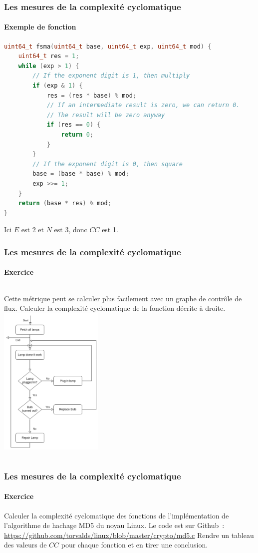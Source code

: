 \documentclass{beamer}
\begin{document}
    \begin{frame}[fragile]
        \transdissolve
        \frametitle{Les mesures de la complexité cyclomatique}
        \framesubtitle{Exemple de fonction}
        \begin{lstlisting}[language=c]
uint64_t fsma(uint64_t base, uint64_t exp, uint64_t mod) {
    uint64_t res = 1;
    while (exp > 1) {
        // If the exponent digit is 1, then multiply
        if (exp & 1) {
            res = (res * base) % mod;
            // If an intermediate result is zero, we can return 0.
            // The result will be zero anyway
            if (res == 0) {
                return 0;
            }
        }
        // If the exponent digit is 0, then square
        base = (base * base) % mod;
        exp >>= 1;
    }
    return (base * res) % mod;
}
        \end{lstlisting}

        Ici $E$ est 2 et $N$ est 3, donc $CC$ est 1.
    \end{frame}

    \begin{frame}[fragile]
        \transdissolve
        \frametitle{Les mesures de la complexité cyclomatique}
        \framesubtitle{Exercice \execcounterdispinc{}}
        \begin{columns}
            Cette métrique peut se calculer plus facilement avec un graphe de contrôle de flux.
            \bigbreak
            Calculer la complexité cyclomatique de la fonction décrite à droite.
            \centering
            \includegraphics[width=5cm]{image/flux-diagram.drawio}
        \end{columns}
    \end{frame}

    \begin{frame}[fragile]
        \transdissolve
        \frametitle{Les mesures de la complexité cyclomatique}
        \framesubtitle{Exercice \execcounterdispinc{}}
        Calculer la complexité cyclomatique des fonctions de l'implémentation de l'algorithme de hachage MD5 du noyau Linux.
        \bigbreak
        Le code est sur Github~: \url{https://github.com/torvalds/linux/blob/master/crypto/md5.c}
        \bigbreak
        Rendre un tableau des valeurs de $CC$ pour chaque fonction et en tirer une conclusion.
    \end{frame}
\end{document}
